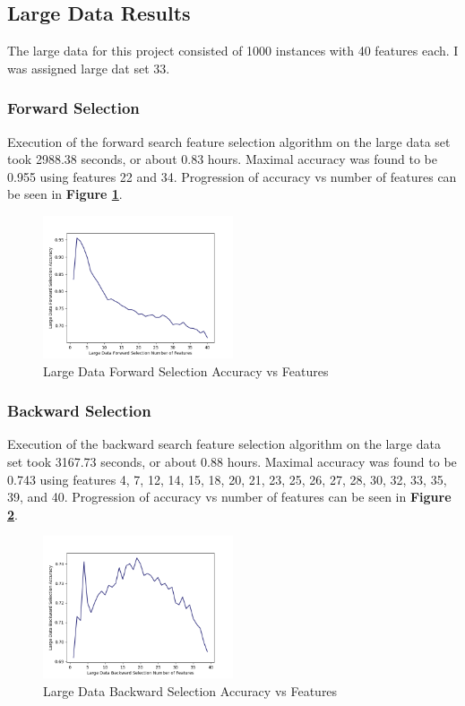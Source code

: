 \documentclass{article}
\begin{document}
\subsection{Large Data Results}
The large data for this project consisted of 1000 instances with 40 features each. I was assigned large dat set 33.
\subsubsection{Forward Selection}
Execution of the forward search feature selection algorithm on the large data set took 2988.38 seconds, or about 0.83 hours. Maximal accuracy was found to be 0.955 using features 22 and 34. Progression of accuracy vs number of features can be seen in \textbf{Figure \ref{fig:Large Data Forward Selection Accuracy vs Features}}.
\begin{figure}[ht]
	\centering
	\includegraphics[width = 0.5\textwidth]{LargeDataForwardSelection.png}
	\caption{Large Data Forward Selection Accuracy vs Features}
	\label{fig:Large Data Forward Selection Accuracy vs Features}
\end{figure}
\subsubsection{Backward Selection}
Execution of the backward search feature selection algorithm on the large data set took 3167.73 seconds, or about 0.88 hours. Maximal accuracy was found to be 0.743 using features 4, 7, 12, 14, 15, 18, 20, 21, 23, 25, 26, 27, 28, 30, 32, 33, 35, 39, and 40. Progression of accuracy vs number of features can be seen in \textbf{Figure \ref{fig:Large Data Backward Selection Accuracy vs Features}}.
\begin{figure}[ht]
	\centering
	\includegraphics[width = 0.5\textwidth]{LargeDataBackwardSelection.png}
	\caption{Large Data Backward Selection Accuracy vs Features}
	\label{fig:Large Data Backward Selection Accuracy vs Features}
\end{figure}
\end{document}
